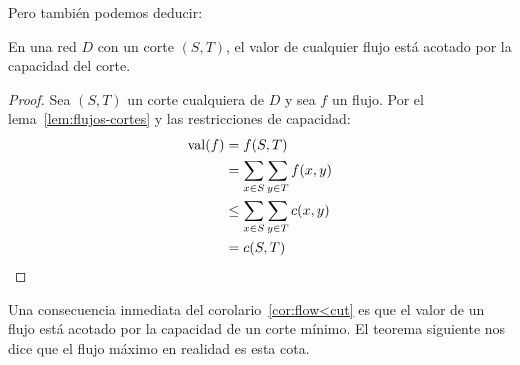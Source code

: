   Pero también podemos deducir:
  \begin{corollary}
    \label{cor:flow<cut}
    En una red \(D\) con un corte \((S, T)\),
    el valor de cualquier flujo
    está acotado por la capacidad del corte.
  \end{corollary}
  \begin{proof}
    Sea \((S, T)\) un corte cualquiera
    de \(D\) y sea \(f\) un flujo.
    Por el lema~\ref{lem:flujos-cortes}
    y las restricciones de capacidad:
    \begin{align*}
      \operatorname{val}(f)
	& =   f(S, T) \\
	& =   \sum_{x \in S} \sum_{y \in T} f(x, y) \\
	& \le \sum_{x \in S} \sum_{y \in T} c(x, y) \\
	& =   c(S, T)
      \qedhere
    \end{align*}
  \end{proof}
  Una consecuencia inmediata del corolario~\ref{cor:flow<cut}
  es que el valor de un flujo está acotado
  por la capacidad de un corte mínimo.
  El teorema siguiente
  nos dice que el flujo máximo en realidad es esta cota.

